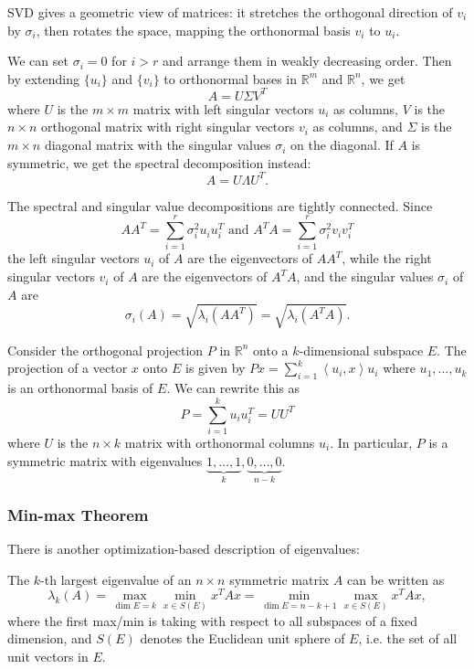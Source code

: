 \begin{remark}
\label{rmk:4.1.2}
SVD gives a geometric view of matrices: it stretches the orthogonal direction of $v_i$ by $\sigma_i$, then 
rotates the space, mapping the orthonormal basis $v_i$ to $u_i$.
\end{remark}

\begin{remark}
\label{rmk:4.1.3}
We can set $\sigma_i = 0$ for $i > r$ and arrange them in weakly decreasing order. Then by extending 
$\{u_i\}$ and $\{v_i\}$ to orthonormal bases in $\mathbb{R}^m$ and $\mathbb{R}^n$, we get 
\[ A = U \Sigma V^T \]
where $U$ is the $m \times m$ matrix with left singular vectors $u_i$ as columns, $V$ is the $n \times n$ 
orthogonal matrix with right singular vectors $v_i$ as columns, and $\Sigma$ is the $m \times n$ diagonal 
matrix with the singular values $\sigma_i$ on the diagonal. If $A$ is symmetric, we get the spectral 
decomposition instead: 
\[ A = U \Lambda U^T. \]
\end{remark}

\begin{remark}
\label{rmk:4.1.4}
The spectral and singular value decompositions are tightly connected. Since 
\[ AA^T = \sum_{i = 1}^{r} \sigma_i^2 u_i u_i^T \text{ and } A^T A = \sum_{i = 1}^{r} \sigma_i^2 v_i v_i^T \]
the left singular vectors $u_i$ of $A$ are the eigenvectors of $AA^T$, while the right singular vectors $v_i$ 
of $A$ are the eigenvectors of $A^T A$, and the singular values $\sigma_i$ of $A$ are 
\[ \sigma_i(A) = \sqrt{\lambda_i(AA^T)} = \sqrt{\lambda_i(A^T A)}. \]
\end{remark}

\begin{remark}
\label{rmk:4.1.5}
Consider the orthogonal projection $P$ in $\mathbb{R}^n$ onto a $k$-dimensional subspace $E$. The projection 
of a vector $x$ onto $E$ is given by $Px = \sum_{i = 1}^{k} \left\langle u_i, x \right\rangle u_i$ where 
$u_1, \dots, u_k$ is an orthonormal basis of $E$. We can rewrite this as 
\[ P = \sum_{i = 1}^{k} u_i u_i^T = UU^T \]
where $U$ is the $n \times k$ matrix with orthonormal columns $u_i$. In particular, $P$ is a symmetric 
matrix with eigenvalues $\underbrace{1, \dots, 1}_{k}, \underbrace{0, \dots, 0}_{n - k}$.
\end{remark}

\subsubsection{Min-max Theorem}
\label{thm:4.1.6}
There is another optimization-based description of eigenvalues:
\begin{theorem}
The $k$-th largest eigenvalue of an $n \times n$ symmetric matrix $A$ can be written as 
\[ \lambda_k(A)= \max_{\dim{E} = k} \min_{x \in S(E)} x^T Ax 
= \min_{\dim{E} = n-k+1} \max_{x \in S(E)} x^T Ax, \]
where the first max/min is taking with respect to all subspaces of a fixed dimension, and $S(E)$ denotes 
the Euclidean unit sphere of $E$, i.e. the set of all unit vectors in $E$. 
\end{theorem}

